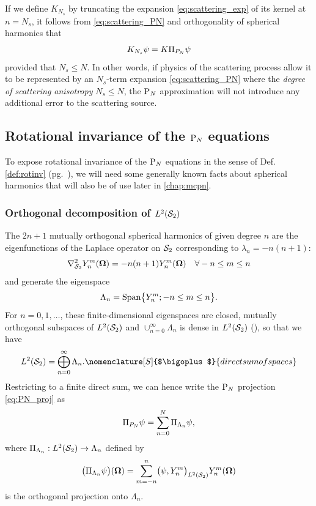 If we define $K_{N_s}$ by truncating the expansion \eqref{eq:scattering_exp} of its kernel at $n = N_s$, it follows
from \eqref{eq:scattering_PN} and orthogonality of spherical harmonics that
\begin{equation}\label{eq:KN}
	K_{N_s}\psi = K\Projop \psi
\end{equation}
provided that $N_s \leq N$. In other words, if physics of the scattering process allow it to be represented by
an $N_s$-term expansion \eqref{eq:scattering_PN} where the \textit{degree of scattering anisotropy} $N_s \leq N$, the 
$\PN$ approximation will not introduce any additional error to the scattering source.

\subsection{Rotational invariance of the $\PN$ equations}\label{sec:dirinvPN}
To expose rotational invariance of the $\PN$ equations in the sense of Def. \ref{def:rotinv} (pg.~\pageref{def:rotinv}),
we will need some generally known facts about spherical harmonics 
that will also be of use later in \cref{chap:mcpn}.

\subsubsection*{Orthogonal decomposition of $\Lp[2](\Sphere)$}
The $2n + 1$ mutually orthogonal spherical harmonics of given degree $n$ are the eigenfunctions of the Laplace
operator on $\Sphere$ corresponding to $\lambda_n = -n(n+1)$: 
$$
	\lap_{\Sphere} \Y{n}{m}(\bomega) = -n(n+1)\Y{n}{m}(\bomega) \quad \forall -n \leq m \leq n
$$
and generate the eigenspace
\begin{equation}
	\label{eq:subspace}
    	\Lambda_n = \text{Span}\bigl\{\Y{n}{m}; -n \leq m \leq n\bigr\}.
\end{equation}
For $n = 0,1,\ldots$, these finite-dimensional eigenspaces are closed, mutually orthogonal subspaces of
$\Lp[2](\Sphere)$ and $\cup_{n=0}^{\infty} \Lambda_n$ is dense in $\Lp[2](\Sphere)$ (\cite{Schreiner}), so that we have
\begin{equation}\label{eq:direct_sum_L2}
	\Lp[2](\Sphere) = \bigoplus_{n=0}^{\infty}\Lambda_n. \nomenclature[S]{$\bigoplus$}{direct sum of
spaces}
\end{equation}
Restricting to a finite direct sum, we can hence write the $\PN$ projection \eqref{eq:PN_proj} as
\begin{equation}\label{eq:pn_approx2}
	\Projop\psi = \suma[n]{0}{N}\Projop[\Lambda_n]\psi,
\end{equation}
where $\Projop[\Lambda_n] : \Lp[2](\Sphere) \to \Lambda_n$ defined by
$$
	\bigl(\Projop[\Lambda_n]\psi\bigr)(\bomega) =
	\suma[m]{-n}{n}\bigl(\psi,\Y{n}{m}\bigr)_{\Lp[2](\Sphere)}\Y{n}{m}(\bomega) 
$$
is the orthogonal projection onto $\Lambda_n$. 

